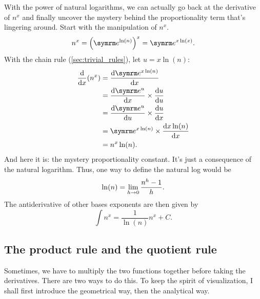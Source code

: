 With the power of natural logarithms, we can actually go back at the derivative of $n^x$ and finally uncover the mystery behind the proportionality term that's lingering around. Start with the manipulation of $n^x$.
\begin{equation}
  n^x = \left(\e^{\ln(n)}\right)^x = \e^{x\ln(x)}.
\end{equation}
With the chain rule (\cref{sec:trivial_rules}), let $u = x\ln(n)$:
\begin{align*}
  \odv*{(n^x)}{x} & = \odv{\e^{x\ln(n)}}{x}                \\
                  & = \odv{\e^u}{x} \times \odv{u}{u}      \\
                  & = \odv{\e^u}{u} \times \odv{u}{x}      \\
                  & = \e^{x\ln(n)} \times \odv{x\ln(n)}{x} \\
                  & = n^x\ln(n).
\end{align*}
And here it is: the mystery proportionality constant. It's just a consequence of the natural logarithm. Thus, one way to define the natural log would be
\begin{equation}
  \ln(n) = \lim_{h \rightarrow 0}\frac{n^h - 1}{h}.
\end{equation}
The antiderivative of other bases exponents are then given by
\begin{equation}
  \int n^x = \frac{1}{\ln(n)}n^x + C.
\end{equation}

\subsection{The product rule and the quotient rule}

Sometimes, we have to multiply the two functions together before taking the derivatives. There are two ways to do this. To keep the spirit of visualization, I shall first introduce the geometrical way, then the analytical way.

